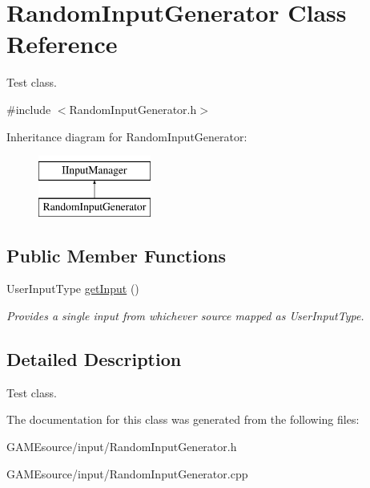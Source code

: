 \hypertarget{class_random_input_generator}{}\section{Random\+Input\+Generator Class Reference}
\label{class_random_input_generator}


Test class.  




{\ttfamily \#include $<$Random\+Input\+Generator.\+h$>$}

Inheritance diagram for Random\+Input\+Generator\+:\begin{figure}[H]
\begin{center}
\leavevmode
\includegraphics[height=2.000000cm]{class_random_input_generator}
\end{center}
\end{figure}
\subsection*{Public Member Functions}
\begin{DoxyCompactItemize}
\item 
\mbox{\label{class_random_input_generator_a519c2556c497b6b5ab521334d39749d9}} 
User\+Input\+Type \mbox{\hyperlink{class_random_input_generator_a519c2556c497b6b5ab521334d39749d9}{get\+Input}} ()
\begin{DoxyCompactList}\small\item\em Provides a single input from whichever source mapped as User\+Input\+Type. \end{DoxyCompactList}\end{DoxyCompactItemize}


\subsection{Detailed Description}
Test class. 

The documentation for this class was generated from the following files\+:\begin{DoxyCompactItemize}
\item 
G\+A\+M\+Esource/input/Random\+Input\+Generator.\+h\item 
G\+A\+M\+Esource/input/Random\+Input\+Generator.\+cpp\end{DoxyCompactItemize}
